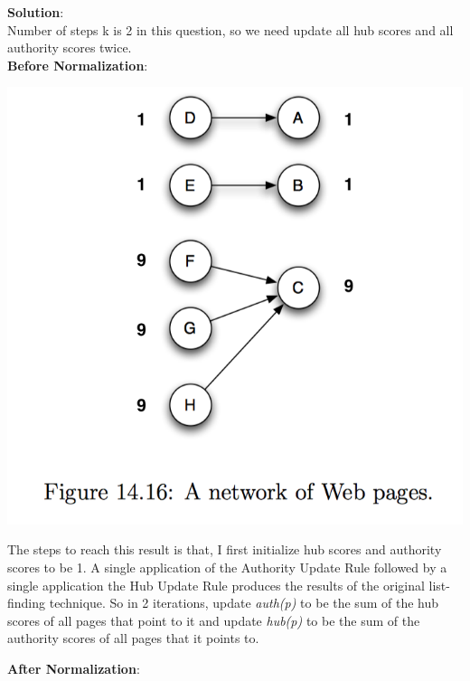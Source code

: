 \documentclass[a4paper]{article}
\begin{document}
\textbf{Solution}:\\

Number of steps k is 2 in this question, so we need update all hub scores and all authority scores twice.\\

\textbf{Before Normalization}:

\begin{center}
  \includegraphics[scale=0.5]{fig1-prev.png}
\end{center}

The steps to reach this result is that, I first initialize hub scores and authority scores to be 1. A single application of the Authority Update Rule followed by a single application the Hub Update Rule produces the results of the original list-finding technique. So in 2 iterations, update \textit{auth(p)} to be the sum of the hub scores of all pages that point to it and update \textit{hub(p)} to be the sum of the authority scores of all pages that it points to.


\textbf{After Normalization}:
\end{document}
